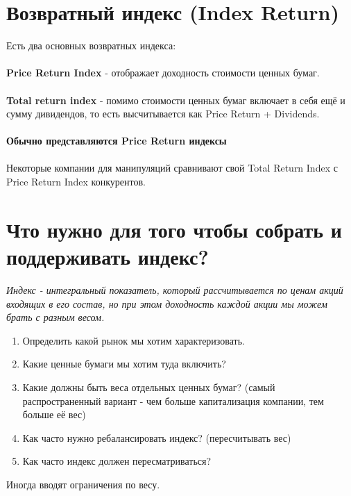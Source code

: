 \documentclass{article}
\begin{document}
\section{Возвратный индекс (Index Return)}

Есть два основных возвратных индекса: \\\\
\textbf{Price Return Index} - отображает доходность стоимости ценных бумаг. \\\\
\textbf{Total return index} - помимо стоимости ценных бумаг включает в себя ещё и сумму дивидендов, то есть высчитывается как Price Return + Dividends. \\\\
\textbf{Обычно представляются Price Return индексы} \\\\
Некоторые компании для манипуляций сравнивают свой Total Return Index с Price Return Index конкурентов.



\section{Что нужно для того чтобы собрать и поддерживать индекс?}
\emph{Индекс - интегральный показатель, который рассчитывается по ценам акций входящих в его состав, но при этом доходность каждой акции мы можем брать с разным весом.}
\begin{enumerate}
  \item Определить какой рынок мы хотим характеризовать.
  \item Какие ценные бумаги мы хотим туда включить?
  \item Какие должны быть веса отдельных ценных бумаг? (самый распространенный вариант - чем больше капитализация компании, тем больше её вес)
  \item Как часто нужно ребалансировать индекс? (пересчитывать вес)
  \item Как часто индекс должен пересматриваться?
\end{enumerate}
Иногда вводят ограничения по весу.

\newpage
\end{document}
